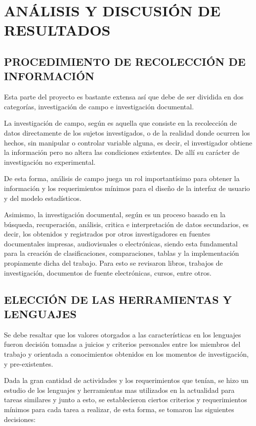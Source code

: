\thispagestyle{empty}

\section{ANÁLISIS Y DISCUSIÓN DE RESULTADOS}

\subsection{PROCEDIMIENTO DE RECOLECCIÓN DE INFORMACIÓN}
Esta parte del proyecto es bastante extensa así que debe de ser dividida en dos
categorías, investigación de campo e investigación documental.

La investigación de campo, según \textcite{MetodologiaInvestigacion}
es aquella que consiste en la recolección de datos directamente de los sujetos
investigados, o de la realidad donde ocurren los hechos,
sin manipular o controlar variable alguna, es decir, el investigador obtiene la
información pero no altera las  condiciones existentes. De allí su carácter de
investigación no experimental.

De esta forma, análisis de campo juega un rol importantísimo para obtener la
información y los requerimientos mínimos para el diseño de la interfaz de usuario
y del modelo estadísticos.

Asimismo, la investigación documental, según \textcite{MetodologiaInvestigacion}
es un proceso
basado en la búsqueda, recuperación, análisis, critica e interpretación de datos
secundarios, es decir, los obtenidos y registrados por otros investigadores en
fuentes documentales impresas, audiovisuales o electrónicas,
siendo esta fundamental para la creación de clasificaciones, comparaciones, tablas
y la implementación propiamente dicha del trabajo. Para esto se revisaron
libros, trabajos de investigación, documentos de fuente electrónicas, cursos,
entre otros.

\subsection{ELECCIÓN DE LAS HERRAMIENTAS Y LENGUAJES}
Se debe resaltar que los valores otorgados a las características en los lenguajes
fueron decisión tomadas a juicios y criterios  personales entre los miembros
del trabajo y orientada a conocimientos obtenidos en los momentos de investigación,
y pre-existentes.

    Dada la gran cantidad de actividades y los requerimientos que tenían,
    se hizo un estudio de los lenguajes y herramientas mas utilizados en
    la actualidad para tareas similares y junto a esto, se establecieron
    ciertos criterios y requerimientos mínimos para cada tarea a realizar, de
    esta forma, se tomaron las siguientes decisiones:

